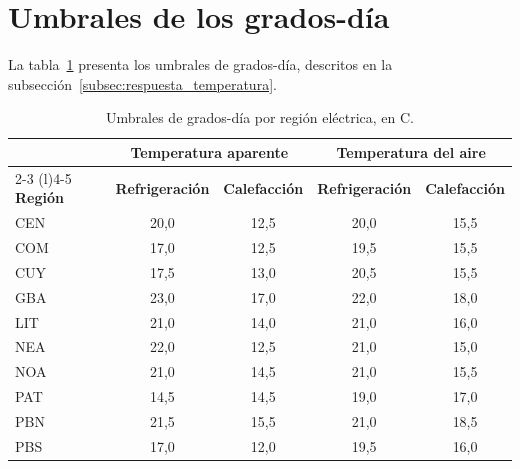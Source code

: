 \section{Umbrales de los grados-día}
\label{sec:apendice_umbrales}

La tabla~\ref{tab:umbrales_grados_dia} presenta los umbrales de grados-día, descritos en la subsección~\ref{subsec:respuesta_temperatura}.

\begin{table}[H]
	\centering
	\caption{Umbrales de grados-día por región eléctrica, en \textdegree C.}
	\label{tab:umbrales_grados_dia}
	\footnotesize
	\setlength{\tabcolsep}{4pt}
	\renewcommand{\arraystretch}{1.15}
	\begin{tabular}{@{}lcccc@{}}
		\toprule
		& \multicolumn{2}{c}{\textbf{Temperatura aparente}} & \multicolumn{2}{c}{\textbf{Temperatura del aire}} \\
		\cmidrule(lr){2-3} \cmidrule(l){4-5}
		\textbf{Región} & \textbf{Refrigeración} & \textbf{Calefacción} & \textbf{Refrigeración} & \textbf{Calefacción} \\
		\midrule
		CEN & 20,0 & 12,5 & 20,0 & 15,5 \\
		COM & 17,0 & 12,5 & 19,5 & 15,5 \\
		CUY & 17,5 & 13,0 & 20,5 & 15,5 \\
		GBA & 23,0 & 17,0 & 22,0 & 18,0 \\
		LIT & 21,0 & 14,0 & 21,0 & 16,0 \\
		NEA & 22,0 & 12,5 & 21,0 & 15,0 \\
		NOA & 21,0 & 14,5 & 21,0 & 15,5 \\
		PAT & 14,5 & 14,5 & 19,0 & 17,0 \\
		PBN & 21,5 & 15,5 & 21,0 & 18,5 \\
		PBS & 17,0 & 12,0 & 19,5 & 16,0 \\
		\bottomrule
	\end{tabular}
\end{table}
